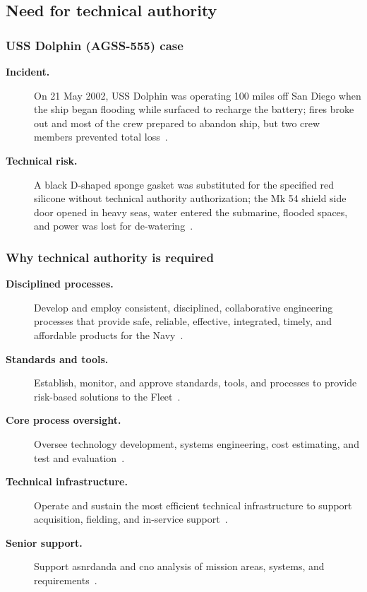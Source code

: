 \documentclass[../main.tex]{subfiles}
\begin{document}
\subsection{Need for technical authority}
\subsubsection{USS Dolphin (AGSS-555) case}
\begin{description}
  \item[\textbf{Incident.}] On 21 May 2002, USS Dolphin was operating 100 miles off San Diego when the ship began flooding while surfaced to recharge the battery; fires broke out and most of the crew prepared to abandon ship, but two crew members prevented total loss~\autocite{edo-2-1-5-technical-authority-2025}.
  \item[\textbf{Technical risk.}] A black D-shaped sponge gasket was substituted for the specified red silicone without technical authority authorization; the Mk 54 shield side door opened in heavy seas, water entered the submarine, flooded spaces, and power was lost for de-watering~\autocite{edo-2-1-5-technical-authority-2025}.
\end{description}

\subsubsection{Why technical authority is required}
\begin{description}
  \item[\textbf{Disciplined processes.}] Develop and employ consistent, disciplined, collaborative engineering processes that provide safe, reliable, effective, integrated, timely, and affordable products for the Navy~\autocite{edo-2-1-5-technical-authority-2025}.
  \item[\textbf{Standards and tools.}] Establish, monitor, and approve standards, tools, and processes to provide risk-based solutions to the Fleet~\autocite{edo-2-1-5-technical-authority-2025}.
  \item[\textbf{Core process oversight.}] Oversee technology development, systems engineering, cost estimating, and test and evaluation~\autocite{edo-2-1-5-technical-authority-2025}.
  \item[\textbf{Technical infrastructure.}] Operate and sustain the most efficient technical infrastructure to support acquisition, fielding, and in-service support~\autocite{edo-2-1-5-technical-authority-2025}.
  \item[\textbf{Senior support.}] Support \ac{asnrdanda} and \ac{cno} analysis of mission areas, systems, and requirements~\autocite{edo-2-1-5-technical-authority-2025}.
\end{description}
\end{document}
